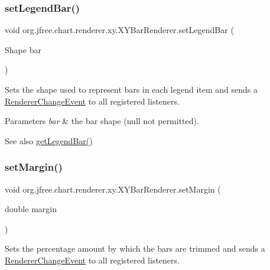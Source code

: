 \subsubsection{\texorpdfstring{set\+Legend\+Bar()}{setLegendBar()}}
{\footnotesize\ttfamily void org.\+jfree.\+chart.\+renderer.\+xy.\+X\+Y\+Bar\+Renderer.\+set\+Legend\+Bar (\begin{DoxyParamCaption}\item[{Shape}]{bar }\end{DoxyParamCaption})}

Sets the shape used to represent bars in each legend item and sends a \mbox{\hyperlink{}{Renderer\+Change\+Event}} to all registered listeners.


\begin{DoxyParams}{Parameters}
{\em bar} & the bar shape ({\ttfamily null} not permitted).\\
\hline
\end{DoxyParams}
\begin{DoxySeeAlso}{See also}
\mbox{\hyperlink{classorg_1_1jfree_1_1chart_1_1renderer_1_1xy_1_1_x_y_bar_renderer_a15d92923759411abc18db2dceb623ee8}{get\+Legend\+Bar()}} 
\end{DoxySeeAlso}
\mbox{\label{classorg_1_1jfree_1_1chart_1_1renderer_1_1xy_1_1_x_y_bar_renderer_a724b6d3ddd8fd0fe8d389a88c2084b21}} 
\subsubsection{\texorpdfstring{set\+Margin()}{setMargin()}}
{\footnotesize\ttfamily void org.\+jfree.\+chart.\+renderer.\+xy.\+X\+Y\+Bar\+Renderer.\+set\+Margin (\begin{DoxyParamCaption}\item[{double}]{margin }\end{DoxyParamCaption})}

Sets the percentage amount by which the bars are trimmed and sends a \mbox{\hyperlink{}{Renderer\+Change\+Event}} to all registered listeners.


